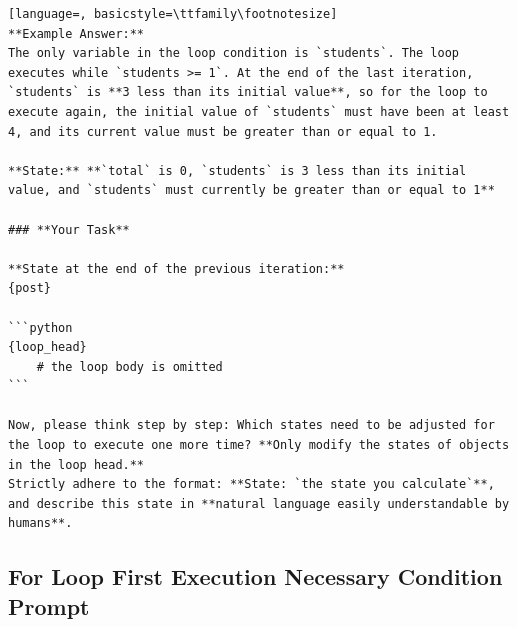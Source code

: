 \documentclass[sigconf]{acmart}
\begin{document}
\begin{tcolorbox}[ colback=gray!10, colframe=black, arc=5pt]
\begin{lstlisting}[language=, basicstyle=\ttfamily\footnotesize]
**Example Answer:**  
The only variable in the loop condition is `students`. The loop executes while `students >= 1`. At the end of the last iteration, `students` is **3 less than its initial value**, so for the loop to execute again, the initial value of `students` must have been at least 4, and its current value must be greater than or equal to 1.

**State:** **`total` is 0, `students` is 3 less than its initial value, and `students` must currently be greater than or equal to 1**

### **Your Task**

**State at the end of the previous iteration:**  
{post}

```python
{loop_head}
    # the loop body is omitted
```

Now, please think step by step: Which states need to be adjusted for the loop to execute one more time? **Only modify the states of objects in the loop head.**
Strictly adhere to the format: **State: `the state you calculate`**, and describe this state in **natural language easily understandable by humans**.

\end{lstlisting}
\end{tcolorbox}

\subsection{For Loop First Execution Necessary Condition Prompt}
\label{for_first_prompt}
\end{document}
